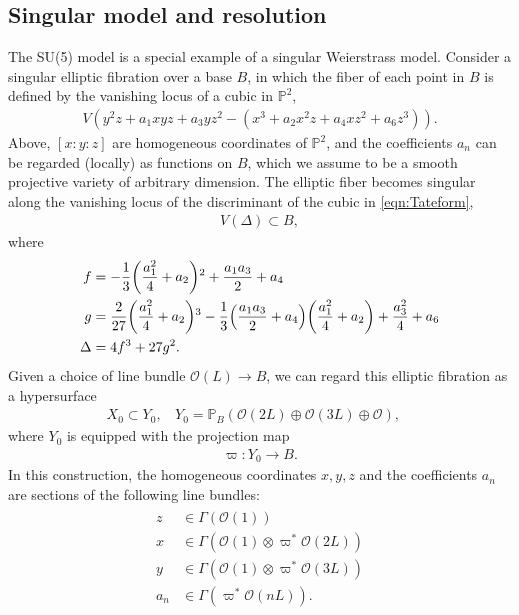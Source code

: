 \documentclass[11pt,oneside,english]{article}
\numberwithin{equation}{section}
\let\originalleft\left
\let\originalright\right
\renewcommand*{\left}{\mathopen{}\mathclose\bgroup\originalleft}
\renewcommand*{\right}{\aftergroup\egroup\originalright}
\theoremstyle{definition}
\begin{document}
\subsection{Singular model and resolution}

The SU(5) model is a special example of a singular Weierstrass model. Consider a singular elliptic fibration over a base $B$, in which the fiber of each point in $B$ is defined by the vanishing locus of a cubic in $\mathbb P^2$,
\begin{align}
\label{eqn:Tateform}
		V(y^2 z + a_1 xy z + a_3 y z^2 - (x^3 + a_2 x^2 z+ a_4 x z^2 + a_6 z^3 )).
	\end{align}
Above, $[x:y:z]$ are homogeneous coordinates of $\mathbb P^2$, and the coefficients $a_n$ can be regarded (locally) as functions on $B$, which we assume to be a smooth projective variety of arbitrary dimension. The elliptic fiber becomes singular along the vanishing locus of the discriminant of the cubic in \cref{eqn:Tateform},
	\begin{align}
		V(\Delta) \subset B,
	\end{align}
where
	\begin{align}
	\begin{split}
			f &= -\frac{1}{3} \left(\frac{a_1^2}{4}+a_2\right){}^2+\frac{a_1 a_3}{2}+a_4\\
			g&= \frac{2}{27} \left(\frac{a_1^2}{4}+a_2\right){}^3-\frac{1}{3} \left(\frac{a_1 a_3}{2}+a_4\right) \left(\frac{a_1^2}{4}+a_2\right)+\frac{a_3^2}{4}+a_6\\
			\Delta &=4 f^3 + 27 g^2.
	\end{split}	
	\end{align}
Given a choice of line bundle $\mathcal O(L) \rightarrow B$, we can regard this elliptic fibration as a hypersurface
	\begin{align}
		X_0 \subset Y_0,~~~~
		Y_0 = \mathbb P_B( \mathcal O(2L) \oplus \mathcal O(3L) \oplus \mathcal O ), ~~~~
	\end{align} 
where $Y_0$ is equipped with the projection map 
	\begin{align}
		\varpi : Y_0 \rightarrow B.
	\end{align}
In this construction, the homogeneous coordinates $x,y,z$ and the coefficients $a_n$ are sections of the following line bundles:
	\begin{align}
	\begin{split}
	z &\in \Gamma(\mathcal O(1))\\
	x &\in \Gamma(\mathcal O(1) \otimes \varpi^* \mathcal  O(2L) )\\
	y &\in \Gamma (\mathcal O(1) \otimes \varpi^* \mathcal O(3L))\\
	a_n &\in \Gamma (\varpi^* \mathcal O(nL)).
	\end{split}
	\end{align}	
\end{document}
